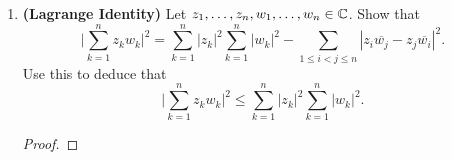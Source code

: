 \documentclass[a4paper]{article}
\begin{document}
\begin{enumerate}
\begin{enumerate}
\begin{proof}
\begin{align*}
                                                           &=  x^{2} -2xu + u^{2} + y^{2} -2yv + v^{2} \\
                                                           &= x^{2} + y^{2} -2(xu + yv) + v^{2} \\
                                                           &= (x^{2}  + y^{2}) -2 \langle z , w \rangle + (v^{2} + u^{2}) \\ 
                                                           &= | z |^{2} - 2 \langle z , w \rangle + | w |^{2}.
\end{align*}
Now, let us prove that \( | z + w  | \leq | z  |  + | w |  \). Consider \( | z + w  |^{2} \). By part (a), we see that
\begin{align*}
    | z + w  |^{2} &= | z  |^{2} + 2 \langle z , w \rangle + | w |^{2} \\
                   &\leq | z |^{2} + 2 z  w + | w |^{2} \\ 
                   &\leq | z |^{2} + 2 | z | | w |  + | w |^{2} \\
                   &= (| z |  + | w | )^{2}.
\end{align*}
By taking the square root of both sides, we see that
\[  | z + w  | \leq | z  |  + | w |. \]
To show the second inequality, consider \( | z - w  |^{2} \). Then using part (a) again, we have
\begin{align*}
    | z - w  |^{2} &= | z |^{2} - 2 \langle z , w \rangle + | w  |^{2} \\
                   & \geq | z |^{2} - 2 | z | | w |  + | w |^{2} \\ 
                   &= (| z |  - | w |)^{2}. 
\end{align*}
By taking the square root of both sides, we see that 
\[  | z - w  | \geq |  | z  |  - | w |  |.  \]



                \end{proof}
        \end{enumerate}
    \item \textbf{(Lagrange Identity)} Let \( {z}_{1}, \dots, {z}_{n}, {w}_{1}, \dots, {w}_{n} \in \mathbb{C}   \). Show that    
        \[  \Big| \sum_{ k=1  }^{ n } {z}_{k} {w}_{k} \Big|^{2} = \sum_{ k=1  }^{ n } | {z}_{k} |^{2} \sum_{ k=1  }^{ n } | {w}_{k } |^{2} - \sum_{ 1 \leq i < j \leq n  }^{  } | {z}_{i} \overline{{w}_{j}} - {z}_{j} \overline{{w}_{i}} |^{2}. \]
        Use this to deduce that 
        \[  \Big| \sum_{ k=1  }^{ n } {z}_{k } {w}_{k } \Big|^{2} \leq \sum_{ k=1  }^{ n } | {z}_{k} |^{2} \sum_{ k=1  }^{ n } | {w}_{k } |^{2}. \]
        \begin{proof}
        

\end{proof}
\end{enumerate}
\end{document}
